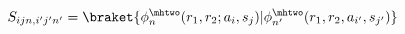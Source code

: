 \begin{equation}
    S_{i j n, i' j' n'} = \braket{\phi^{\mhtwo}_{n}(r_1, r_2 ; a_i, s_j) | \phi^{\mhtwo}_{n'}(r_1, r_2, a_{i'}, s_{j'})}
\label{eq:overlap_elements}
\end{equation}
